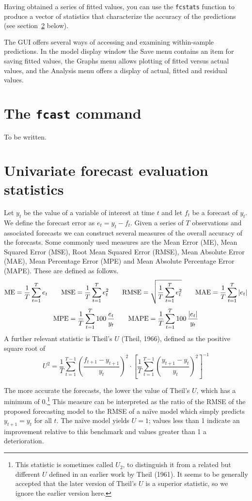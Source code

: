 Having obtained a series of fitted values, you can use the
\texttt{fcstats} function to produce a vector of statistics that
characterize the accuracy of the predictions (see
section~\ref{sec:fcast-stats} below).

The  GUI offers several ways of accessing and examining
within-sample predictions.  In the model display window the
\textsf{Save} menu contains an item for saving fitted values, the
\textsf{Graphs} menu allows plotting of fitted versus actual values,
and the \textsf{Analysis} menu offers a display of actual, fitted and
residual values.


\section{The \texttt{fcast} command}
\label{sec:fcast-fcast}

To be written.

\section{Univariate forecast evaluation statistics}
\label{sec:fcast-stats}

Let $y_t$ be the value of a variable of interest at time $t$ and let
$f_t$ be a forecast of $y_t$.  We define the forecast error as $e_t =
y_t - f_t$.  Given a series of $T$ observations and associated
forecasts we can construct several measures of the overall accuracy of
the forecasts.  Some commonly used measures are the Mean Error (ME),
Mean Squared Error (MSE), Root Mean Squared Error (RMSE), Mean
Absolute Error (MAE), Mean Percentage Error (MPE) and Mean Absolute
Percentage Error (MAPE).  These are defined as follows.
%
\[ {\rm ME} = \frac{1}{T} \sum_{t=1}^T e_t \qquad 
   {\rm MSE} = \frac{1}{T} \sum_{t=1}^T e_t^2 \qquad 
   {\rm RMSE} = \sqrt{\frac{1}{T} \sum_{t=1}^T e_t^2} \qquad 
   {\rm MAE} = \frac{1}{T} \sum_{t=1}^T |e_t|
\] 
%
\[ {\rm MPE} = \frac{1}{T} \sum_{t=1}^T 100\, \frac{e_t}{y_t} \qquad
   {\rm MAPE} = \frac{1}{T} \sum_{t=1}^T 100\, \frac{|e_t|}{y_t} 
\]
%
A further relevant statistic is Theil's $U$ (Theil, 1966), defined as
the positive square root of
%
\[ 
U^2 = \frac{1}{T}
     \sum_{t=1}^{T-1} \left(\frac{f_{t+1} - y_{t+1}}{y_t}\right)^2
     \cdot \left[
     \frac{1}{T} \sum_{t=1}^{T-1} 
        \left(\frac{y_{t+1} - y_t}{y_t}\right)^2 \right]^{-1}
\]

The more accurate the forecasts, the lower the value of Theil's $U$,
which has a minimum of 0.\footnote{This statistic is sometimes called
  $U_2$, to distinguish it from a related but different $U$ defined in
  an earlier work by Theil (1961).  It seems to be generally accepted
  that the later version of Theil's $U$ is a superior statistic, so we
  ignore the earlier version here.} This measure can be interpreted as
the ratio of the RMSE of the proposed forecasting model to the RMSE of
a na\"ive model which simply predicts $y_{t+1} = y_t$ for all $t$.
The na\"ive model yields $U = 1$; values less than 1 indicate an
improvement relative to this benchmark and values greater than 1 a
deterioration.

